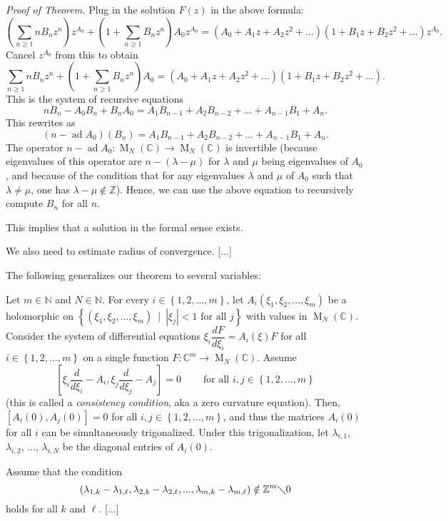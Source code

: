 \documentclass[etingof-lie.tex]{subfiles}
\begin{document}
\textit{Proof of Theorem.} Plug in the solution $F\left(  z\right)  $ in the
above formula:%
\[
\left(  \sum\limits_{n\geq1}nB_{n}z^{n}\right)  z^{A_{0}}+\left(
1+\sum\limits_{n\geq1}B_{n}z^{n}\right)  A_{0}z^{A_{0}}=\left(  A_{0}%
+A_{1}z+A_{2}z^{2}+...\right)  \left(  1+B_{1}z+B_{2}z^{2}+...\right)
z^{A_{0}}.
\]
Cancel $z^{A_{0}}$ from this to obtain%
\[
\sum\limits_{n\geq1}nB_{n}z^{n}+\left(  1+\sum\limits_{n\geq1}B_{n}%
z^{n}\right)  A_{0}=\left(  A_{0}+A_{1}z+A_{2}z^{2}+...\right)  \left(
1+B_{1}z+B_{2}z^{2}+...\right)  .
\]
This is the system of recursive equations%
\[
nB_{n}-A_{0}B_{n}+B_{n}A_{0}=A_{1}B_{n-1}+A_{2}B_{n-2}+...+A_{n-1}B_{1}%
+A_{n}.
\]
This rewrites as%
\[
\left(  n-\operatorname*{ad}A_{0}\right)  \left(  B_{n}\right)  =A_{1}%
B_{n-1}+A_{2}B_{n-2}+...+A_{n-1}B_{1}+A_{n}.
\]
The operator $n-\operatorname*{ad}A_{0}:\operatorname*{M}\nolimits_{N}\left(
\mathbb{C}\right)  \rightarrow\operatorname*{M}\nolimits_{N}\left(
\mathbb{C}\right)  $ is invertible (because eigenvalues of this operator are
$n-\left(  \lambda-\mu\right)  $ for $\lambda$ and $\mu$ being eigenvalues of
$A_{0}$, and because of the condition that for any eigenvalues $\lambda$ and
$\mu$ of $A_{0}$ such that $\lambda\neq\mu$, one has $\lambda-\mu
\notin\mathbb{Z}$). Hence, we can use the above equation to recursively
compute $B_{n}$ for all $n$.

This implies that a solution in the formal sense exists.

We also need to estimate radius of convergence. [...]

The following generalizes our theorem to several variables:

\begin{theorem}
Let $m\in\mathbb{N}$ and $N\in\mathbb{N}$. For every $i\in\left\{
1,2,...,m\right\}  $, let $A_{i}\left(  \xi_{1},\xi_{2},...,\xi_{m}\right)  $
be a holomorphic on $\left\{  \left(  \xi_{1},\xi_{2},...,\xi_{m}\right)
\ \mid\ \left\vert \xi_{j}\right\vert <1\text{ for all }j\right\}  $ with
values in $\operatorname*{M}\nolimits_{N}\left(  \mathbb{C}\right)  $.
Consider the system of differential equations $\xi_{i}\dfrac{dF}{d\xi_{i}%
}=A_{i}\left(  \xi\right)  F$ for all $i\in\left\{  1,2,...,m\right\}  $ on a
single function $F:\mathbb{C}^{m}\rightarrow\operatorname*{M}\nolimits_{N}%
\left(  \mathbb{C}\right)  $. Assume
\[
\left[  \xi_{i}\dfrac{d}{d\xi_{i}}-A_{i},\xi_{j}\dfrac{d}{d\xi_{j}}%
-A_{j}\right]  =0\ \ \ \ \ \ \ \ \ \ \text{for all }i,j\in\left\{
1,2,...,m\right\}
\]
(this is called a \textit{consistency condition}, aka a zero curvature
equation). Then, $\left[  A_{i}\left(  0\right)  ,A_{j}\left(  0\right)
\right]  =0$ for all $i,j\in\left\{  1,2,...,m\right\}  $, and thus the
matrices $A_{i}\left(  0\right)  $ for all $i$ can be simultaneously
trigonalized. Under this trigonalization, let $\lambda_{i,1}$, $\lambda_{i,2}%
$, $...$, $\lambda_{i,N}$ be the diagonal entries of $A_{i}\left(  0\right)  $.

Assume that the condition
\[
\left(  \lambda_{1,k}-\lambda_{1,\ell},\lambda_{2,k}-\lambda_{2,\ell
},...,\lambda_{m,k}-\lambda_{m,\ell}\right)  \notin\mathbb{Z}^{m}\diagdown0
\]
holds for all $k$ and $\ell$. [...]
\end{theorem}
\end{document}
